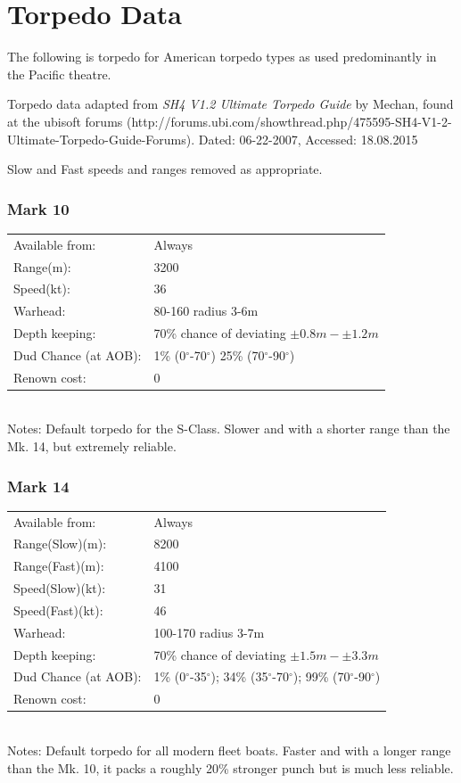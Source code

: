 \documentclass{article}
\newcommand{\degree}{$^{\circ}$}
\begin{document}
\section{Torpedo Data}

The following is torpedo for American torpedo types as used predominantly in the Pacific theatre.

Torpedo data adapted from \emph{SH4 V1.2 Ultimate Torpedo Guide} by Mechan, found at the ubisoft forums (http://forums.ubi.com/showthread.php/475595-SH4-V1-2-Ultimate-Torpedo-Guide-Forums). Dated: 06-22-2007, Accessed: 18.08.2015

Slow and Fast speeds and ranges removed as appropriate.

\subsubsection{Mark 10}
\begin{tabular}{l|l}
Available from:& Always\\
Range(m):& 3200\\
Speed(kt):&36\\
Warhead:& 80-160 radius 3-6m\\
Depth keeping:& 70\% chance of deviating $\pm 0.8m - \pm 1.2m$\\
Dud Chance (at AOB):& 1\% (0\degree -70\degree ) 25\% (70\degree-90\degree)\\
Renown cost:& 0\\
\end{tabular} \\
Notes: Default torpedo for the S-Class. Slower and with a shorter range than the Mk. 14, but extremely reliable.\\

\subsubsection{Mark 14}
\begin{tabular}{l|l}
Available from:& Always\\
Range(Slow)(m):& 8200\\
Range(Fast)(m):& 4100\\
Speed(Slow)(kt):&31\\
Speed(Fast)(kt):& 46\\
Warhead:& 100-170 radius 3-7m\\
Depth keeping:& 70\% chance of deviating $\pm 1.5m - \pm 3.3m$\\
Dud Chance (at AOB):& 1\% (0\degree-35\degree); 34\% (35\degree-70\degree); 99\% (70\degree-90\degree)\\
Renown cost:& 0\\
\end{tabular} \\
Notes: Default torpedo for all modern fleet boats. Faster and with a longer range than the Mk. 10, it packs a roughly 20\% stronger punch but is much less reliable.
\end{document}
